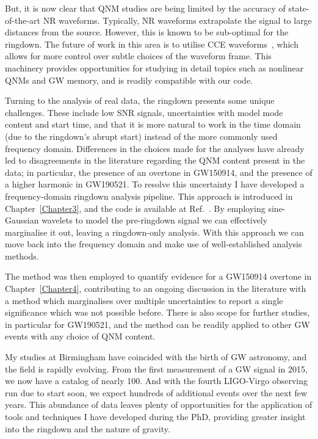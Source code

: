 \documentclass[
12pt, %
english, %
doublespacing, %
headsepline, %
]{MastersDoctoralThesis} %
\begin{document}
But, it is now clear that QNM studies are being limited by the accuracy of state-of-the-art NR waveforms. 
Typically, NR waveforms extrapolate the signal to large distances from the source.
However, this is known to be sub-optimal for the ringdown.
The future of work in this area is to utilise CCE waveforms~\cite{MaganaZertuche:2021syq}, which allows for more control over subtle choices of the waveform frame.
This machinery provides opportunities for studying in detail topics such as nonlinear QNMs and GW memory, and is readily compatible with our code.

Turning to the analysis of real data, the ringdown presents some unique challenges. 
These include low SNR signals, uncertainties with model mode content and start time, and that it is more natural to work in the time domain (due to the ringdown's abrupt start) instead of the more commonly used frequency domain.
Differences in the choices made for the analyses have already led to disagreements in the literature regarding the QNM content present in the data; in particular, the presence of an overtone in GW150914, and the presence of a higher harmonic in GW190521. 
To resolve this uncertainty I have developed a frequency-domain ringdown analysis pipeline.
This approach is introduced in Chapter~\ref{Chapter3}, and the code is available at Ref.~\cite{fdringdown}.
By employing sine-Gaussian wavelets to model the pre-ringdown signal we can effectively marginalise it out, leaving a ringdown-only analysis. 
With this approach we can move back into the frequency domain and make use of well-established analysis methods.

The method was then employed to quantify evidence for a GW150914 overtone in Chapter~\ref{Chapter4}, contributing to an ongoing discussion in the literature with a method which marginalises over multiple uncertainties to report a single significance which was not possible before.
There is also scope for further studies, in particular for GW190521, and the method can be readily applied to other GW events with any choice of QNM content. 

My studies at Birmingham have coincided with the birth of GW astronomy, and the field is rapidly evolving.
From the first measurement of a GW signal in 2015, we now have a catalog of nearly 100.
And with the fourth LIGO-Virgo observing run due to start soon, we expect hundreds of additional events over the next few years.
This abundance of data leaves plenty of opportunities for the application of tools and techniques I have developed during the PhD, providing greater insight into the ringdown and the nature of gravity.
\end{document}
